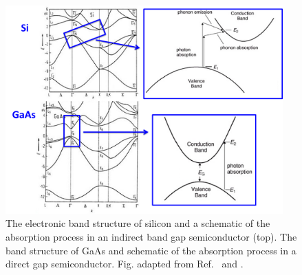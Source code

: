 \documentclass[11pt, twoside]{report}
\begin{document}
\begin{figure}[h!]
  \centering
    \includegraphics[width=0.95\textwidth]{figures/Si_and_GaAs.png}
    \caption[The electronic band structure of silicon and a schematic of the absorption process in an indirect band gap semiconductor (top). The band structure of GaAs and schematic of the absorption process in a direct gap semiconductor.]{The electronic band structure of silicon and a schematic of the absorption process in an indirect band gap semiconductor (top). The band structure of GaAs and schematic of the absorption process in a direct gap semiconductor. Fig. adapted from Ref.~ and .}
  \label{Si_and_GaAs}
\end{figure}
\end{document}
